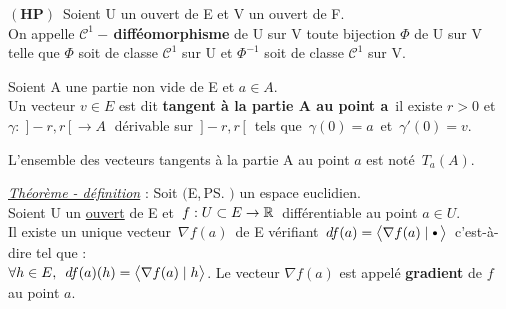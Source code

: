 \vspace{1.5cm}

\(\left(\mathbf{HP}\right)\,\) Soient U un ouvert de E et V un ouvert de F.\vspace{0.1cm}\\
On appelle $\mathscr{C}^1-\,$\textbf{difféomorphisme} de U sur V toute bijection $\Phi$ de U sur V telle que $\Phi$ soit de classe $\mathscr{C}^1$ sur U et $\Phi^{-1}$ soit de classe $\mathscr{C}^1$ sur V.

\vspace{1.2cm}

Soient A une partie non vide de E et \(a\in A.\)\vspace{0.1cm}\\
Un vecteur \(v\in E\) est dit \textbf{tangent à la partie A au point a}\, \ssi il existe $r>0$ et\vspace{0.1cm}\\
\(\gamma:\;]-r,r\,[\,\to A\;\) dérivable sur \(\,]-r,r\,[\;\) tels que \(\,\gamma(0)=a\,\) et \(\,\gamma'(0)=v\).\vspace{0.2cm}\\
\begin{small}L'ensemble des vecteurs tangents à la partie A au point $a$ est noté \(\,T_a(A).\)\end{small}

\vspace{1cm}

\underline{\emph{Théorème - définition}} : Soit $\bigl($E,\,\ps$\bigr)$ un espace euclidien.\vspace{0.1cm}\\
Soient U un \underline{ouvert} de E et \(\,f:U\subset E\to \mathbb{R}\,\) différentiable au point \(a\in U\).\vspace{0.1cm}\\
Il existe un unique vecteur \(\,\nabla f(a)\,\) de E vérifiant \(\,df(a)=\psm{\nabla f(a)}{\sbullet[0.75]\,}\,\) c'est-à-dire tel que :\vspace{0.1cm}\\
\(\forall h\in E,\ \, df(a)(h)=\bigl\langle\nabla f(a)\mid h \bigr\rangle\). Le vecteur $\nabla f(a)$ est appelé \textbf{gradient} de $f$ au point $a$.

\newpage

